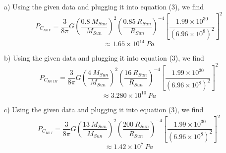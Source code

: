 \documentclass{article}
\begin{document}
a) Using the given data and plugging it into equation (3), we find
\[P_{C_{K0\:V}} = \frac{3}{8\pi}G\left(\frac{0.8 \:M_{Sun}}{M_{Sun}}\right)^2\left(\frac{0.85 \:R_{Sun}}{R_{Sun}}\right)^{-4}\left[\frac{1.99 \times 10^{30}}{(6.96 \times 10^8)^2}\right]^2\]
\[\approx 1.65 \times 10^{14} \: Pa\]

b) Using the given data and plugging it into equation (3), we find
\[P_{C_{K0\:III}} = \frac{3}{8\pi}G\left(\frac{4 \:M_{Sun}}{M_{Sun}}\right)^2\left(\frac{16 \:R_{Sun}}{R_{Sun}}\right)^{-4}\left[\frac{1.99 \times 10^{30}}{(6.96 \times 10^8)^2}\right]^2\]
\[\approx 3.280 \times 10^{10} \: Pa\]


c) Using the given data and plugging it into equation (3), we find
\[P_{C_{K0\:I}} = \frac{3}{8\pi}G\left(\frac{13 \:M_{Sun}}{M_{Sun}}\right)^2\left(\frac{200 \:R_{Sun}}{R_{Sun}}\right)^{-4}\left[\frac{1.99 \times 10^{30}}{(6.96 \times 10^8)^2}\right]^2\]
\[\approx 1.42 \times 10^{7} \: Pa\]
\end{document}
